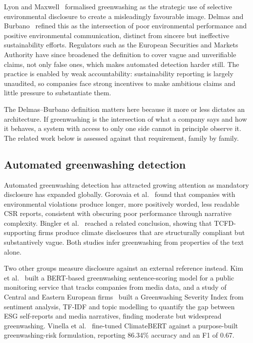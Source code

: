 \documentclass[fontsize=12pt,oneside,headings=small]{scrreprt}
\begin{document}
Lyon and Maxwell~\cite{lyon2011greenwash} formalised greenwashing as the strategic use of selective environmental disclosure to create a misleadingly favourable image. Delmas and Burbano~\cite{delmas2011drivers} refined this as the intersection of poor environmental performance and positive environmental communication, distinct from sincere but ineffective sustainability efforts. Regulators such as the European Securities and Markets Authority have since broadened the definition to cover vague and unverifiable claims, not only false ones, which makes automated detection harder still. The practice is enabled by weak accountability: sustainability reporting is largely unaudited, so companies face strong incentives to make ambitious claims and little pressure to substantiate them.

The Delmas--Burbano definition matters here because it more or less dictates an architecture. If greenwashing is the intersection of what a company says and how it behaves, a system with access to only one side cannot in principle observe it. The related work below is assessed against that requirement, family by family.

\subsection{Automated greenwashing detection}

Automated greenwashing detection has attracted growing attention as mandatory disclosure has expanded globally. Gorovaia et al.~\cite{gorovaia2025identifying} found that companies with environmental violations produce longer, more positively worded, less readable CSR reports, consistent with obscuring poor performance through narrative complexity. Bingler et al.~\cite{bingler2022cheap} reached a related conclusion, showing that TCFD-supporting firms produce climate disclosures that are structurally compliant but substantively vague. Both studies infer greenwashing from properties of the text alone.

Two other groups measure disclosure against an external reference instead. Kim et al.~\cite{kim2022establishment} built a BERT-based greenwashing sentence-scoring model for a public monitoring service that tracks companies from media data, and a study of Central and Eastern European firms~\cite{davidescu2026detecting} built a Greenwashing Severity Index from sentiment analysis, TF-IDF and topic modelling to quantify the gap between ESG self-reports and media narratives, finding moderate but widespread greenwashing. Vinella et al.~\cite{vinella2023greenwashing} fine-tuned ClimateBERT against a purpose-built greenwashing-risk formulation, reporting 86.34\% accuracy and an F1 of 0.67.
\end{document}
